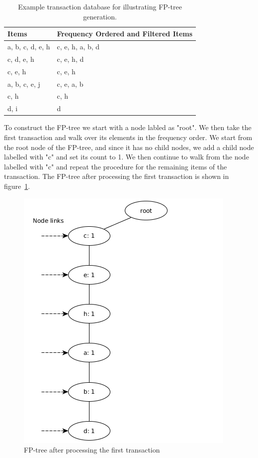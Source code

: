 \begin{table}[htb]
\begin{center}
    \begin{tabular}{ | l | l | }
    \hline
	\textbf{Items} & \textbf{Frequency Ordered and Filtered Items} \\ \hline
    a, b, c, d, e, h & c, e, h, a, b, d \\ \hline 
    c, d, e, h & c, e, h, d \\ \hline 
    c, e, h & c, e, h \\ \hline 
    a, b, c, e, j & c, e, a, b \\ \hline 
    c, h & c, h \\ \hline
    d, i & d \\ \hline
    \end{tabular}
    \caption{Example transaction database for illustrating FP-tree generation.}
    \label{table:fp-growth-example1}
\end{center}
\end{table} 

To construct the FP-tree we start with a node labled as "root". We then take the first transaction and walk over its elements in the frequency order. We start from the root node of the FP-tree, and since it has no child nodes, we add a child node labelled with "c" and set its count to 1. We then continue to walk from the node labelled with "c" and repeat the procedure for the remaining items of the transaction. The FP-tree after processing the first transaction is shown in figure~\ref{figure:fp-growth-example1}.

\begin{figure}[h]
	\centering
	\includegraphics[scale=0.5]{fp-tree-example/fp-tree-p1.png}
	\caption{FP-tree after processing the first transaction}
	\label{figure:fp-growth-example1}
\end{figure}

